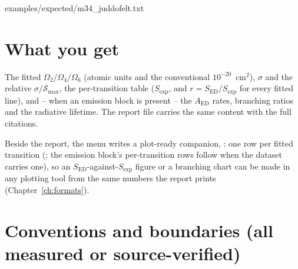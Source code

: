 
  {examples/expected/m34_juddofelt.txt}

\section{What you get}

The fitted $\Omega_2/\Omega_4/\Omega_6$ (atomic units and the conventional
$10^{-20}$~cm$^2$), $\sigma$ and the relative $\sigma/\mathcal{S}_{\max}$,
the per-transition table ($S_{\exp}$, and $r = S_{\mathrm{ED}}/S_{\exp}$
for every fitted line), and -- when an emission block is present -- the
$A_{\mathrm{ED}}$ rates, branching ratios and the radiative lifetime.  The
report file  carries the same content with the
full citations.

Beside the report, the menu writes a plot-ready companion,
: one row per fitted transition
(;
the emission block's per-transition rows follow when the dataset carries
one), so an $S_{\mathrm{ED}}$-against-$S_{\exp}$ figure or a branching
chart can be made in any plotting tool from the same numbers the report
prints (Chapter~\ref{ch:formats}).

\section{Conventions and boundaries (all measured or source-verified)}


